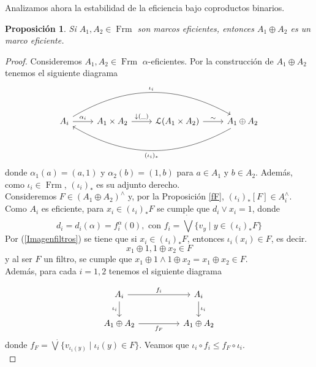 \documentclass[11pt]{amsart}
\DeclareMathOperator{\Frm}{Frm}
\theoremstyle{plain}
\newtheorem{prop}[thm]{Proposición}
\theoremstyle{definition}
\begin{document}
Analizamos ahora la estabilidad de la eficiencia bajo coproductos binarios.
\begin{prop}\label{tidyplus}
Si $A_1, A_2\in \Frm$ son marcos eficientes, entonces $A_1\oplus A_2$ es un marco eficiente.
\end{prop}

\begin{proof}
Consideremos $A_1, A_2\in \Frm$ $\alpha$-eficientes. Por la construcción de $A_1\oplus A_2$ tenemos el siguiente diagrama
\[
\begin{tikzcd}
A_i \arrow[r, "\alpha_i"] \arrow[rrr, "\iota_i", bend left] & A_1\times A_2  \arrow[r, "\downarrow(\_)"] & \mathcal{L}(A_1\times A_2) \arrow[r, "\sim"] & A_1\oplus A_2 \arrow[lll, "(\iota_i)_*", bend left]
\end{tikzcd}
\]
donde $\alpha_1(a)=(a, 1)$ y $\alpha_2(b)=(1, b)$ para $a\in A_1$ y $b\in A_2$. Además, como $\iota_i\in \Frm$, $(\iota_i)_*$ es su adjunto derecho.\\

Consideremos $F\in (A_1\oplus A_2)^\wedge$ y, por la Proposición \ref{fF}, $(\iota_i)_*[F]\in A_i^\wedge$. Como $A_i$ es eficiente, para $x_i\in (\iota_i)_*F$ se cumple que $d_i\vee x_i=1$, donde 
\[
d_i=d_i(\alpha)=f_i^\alpha(0), \mbox{ con } f_i=\dot{\bigvee}\{v_y\mid y\in (\iota_i)_*F\}
\]
Por (\ref{Imagenfiltros}) se tiene que si $x_i\in (\iota_i)_*F$, entonces $\iota_i(x_i)\in F$, es decir.
\[
x_1\oplus 1, 1\oplus x_2\in F
\]
y al ser $F$ un filtro, se cumple que $x_1\oplus 1\wedge 1\oplus x_2=x_1\oplus x_2\in F$.\\

Además, para cada $i=1, 2$ tenemos el siguiente diagrama

\[\begin{tikzcd}
	{A_i} && {A_i} \\
	{A_1\oplus A_2} && {A_1\oplus A_2}
	\arrow["{f_i}", from=1-1, to=1-3]
	\arrow["{\iota_i}"', from=1-1, to=2-1]
	\arrow["{\iota_i}", from=1-3, to=2-3]
	\arrow["f_F"', from=2-1, to=2-3]
\end{tikzcd}\]
donde $f_F=\dot{\bigvee}\{v_{\iota_i(y)}\mid \iota_i(y)\in F\}$. Veamos que $\iota_i\circ f_i\leq f_F\circ \iota_i$.\\
    

\end{proof}
\end{document}
